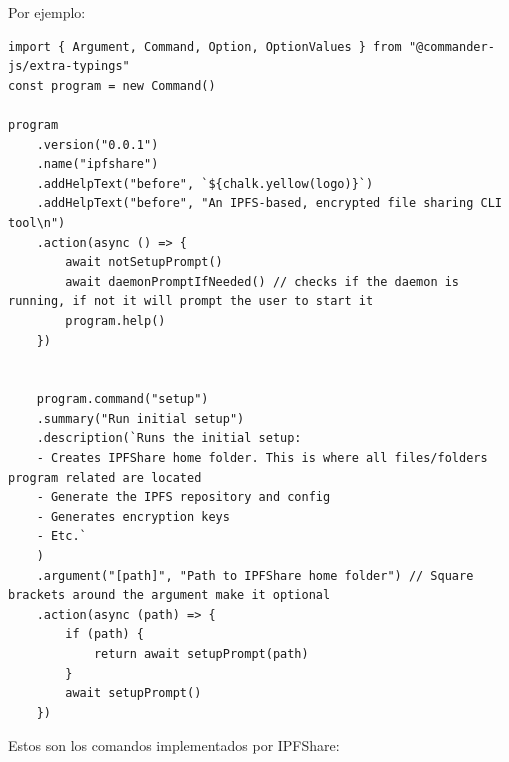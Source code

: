 Por ejemplo:
\begin{verbatim}
import { Argument, Command, Option, OptionValues } from "@commander-js/extra-typings"
const program = new Command()

program
    .version("0.0.1")
    .name("ipfshare")
    .addHelpText("before", `${chalk.yellow(logo)}`)
    .addHelpText("before", "An IPFS-based, encrypted file sharing CLI tool\n")
    .action(async () => {
        await notSetupPrompt()
        await daemonPromptIfNeeded() // checks if the daemon is running, if not it will prompt the user to start it
        program.help()
    })


    program.command("setup")
    .summary("Run initial setup")
    .description(`Runs the initial setup:
    - Creates IPFShare home folder. This is where all files/folders program related are located
    - Generate the IPFS repository and config
    - Generates encryption keys
    - Etc.`
    )
    .argument("[path]", "Path to IPFShare home folder") // Square brackets around the argument make it optional
    .action(async (path) => {
        if (path) {
            return await setupPrompt(path)
        }
        await setupPrompt()
    })
\end{verbatim}

Estos son los comandos implementados por IPFShare:

